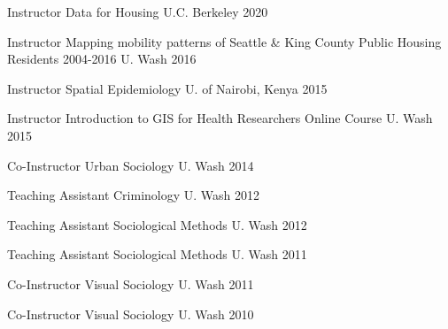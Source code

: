 



\begin{cvhonors}

  \cvhonor
    {Instructor} %
    {Data for Housing} %
    {U.C. Berkeley} %
    {2020} %

  \cvhonor
    {Instructor} %
    {Mapping mobility patterns of Seattle \& King County Public Housing Residents 2004-2016} %
    {U. Wash} %
    {2016} %

  \cvhonor
    {Instructor} %
    {Spatial Epidemiology} %
    {U. of Nairobi, Kenya} %
    {2015} %

  \cvhonor
    {Instructor} %
    {Introduction to GIS for Health Researchers Online Course} %
    {U. Wash} %
    {2015} %

  \cvhonor
    {Co-Instructor} %
    {Urban Sociology} %
    {U. Wash} %
    {2014} %

  \cvhonor
    {Teaching Assistant} %
    {Criminology} %
    {U. Wash} %
    {2012} %

  \cvhonor
    {Teaching Assistant} %
    {Sociological Methods} %
    {U. Wash} %
    {2012} %

  \cvhonor
    {Teaching Assistant} %
    {Sociological Methods} %
    {U. Wash} %
    {2011} %

  \cvhonor
    {Co-Instructor} %
    {Visual Sociology} %
    {U. Wash} %
    {2011} %

  \cvhonor
    {Co-Instructor} %
    {Visual Sociology} %
    {U. Wash} %
    {2010} %
    
\end{cvhonors}